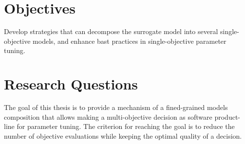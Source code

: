 




\section{Objectives}
        Develop strategies that can decompose the surrogate model into several single-objective models, and enhance bast practices in single-objective parameter tuning.

    \section{Research Questions}
    The goal of this thesis is to provide a mechanism of a fined-grained models composition that allows making a multi-objective decision as software product-line for parameter tuning. The criterion for reaching the goal is to reduce the number of objective evaluations while keeping the optimal quality of a decision.

